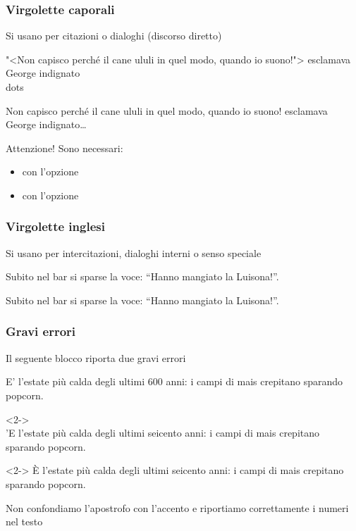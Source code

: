\documentclass[svgnames,%
	ucs,%
	pdftex]{guitbeamer}
\begin{document}
\begin{frame}
  \frametitle{Virgolette caporali}
	Si usano per citazioni o dialoghi (discorso diretto)
	\begin{LaTeXcode}
		\alert{"<}Non capisco perch\'e il cane ululi in quel modo, quando io
		suono!\alert{">} esclamava George indignato\\dots
	\end{LaTeXcode}
	\begin{LaTeXoutput}
		{\selectfont\guillemotleft}Non capisco
		perch\'e il cane ululi in quel modo, quando io
		suono!{\selectfont\guillemotright}
		esclamava George indignato\dots
	\end{LaTeXoutput}
	\begin{block}{Attenzione!}
		Sono necessari:
		\begin{itemize}
			\item{} con l'opzione \LCmd[]{italian}
			\item{} con l'opzione \LCmd[]{T1}	
		\end{itemize}
	\end{block}
\end{frame}
\begin{frame}
  \frametitle{Virgolette inglesi}
	Si usano per intercitazioni, dialoghi interni o senso speciale
	\begin{LaTeXcode}
		Subito nel bar si sparse la voce: \alert{``}Hanno mangiato la
		Luisona!\alert{''}.
	\end{LaTeXcode}
	\begin{LaTeXoutput}
		Subito nel bar si sparse la voce: ``Hanno mangiato la Luisona!''.
	\end{LaTeXoutput}
\end{frame}
\begin{frame}
  \frametitle{Gravi errori}
	Il seguente blocco riporta due gravi errori
	\begin{LaTeXoutput}
		E' l'estate più calda degli ultimi 600 anni: i campi di mais crepitano sparando popcorn.
	\end{LaTeXoutput}
	\begin{LaTeXcode}<2->
		\alert{\\ 'E} l'estate più calda degli ultimi \alert{seicento} anni: i campi di mais crepitano sparando popcorn.
	\end{LaTeXcode}
	\begin{LaTeXoutput}<2->
		\`E l'estate più calda degli ultimi seicento anni: i campi di mais crepitano sparando popcorn.
	\end{LaTeXoutput}
  \smallskip
	Non confondiamo l'apostrofo con l'accento e riportiamo correttamente i numeri nel testo 
\end{frame}
\end{document}
